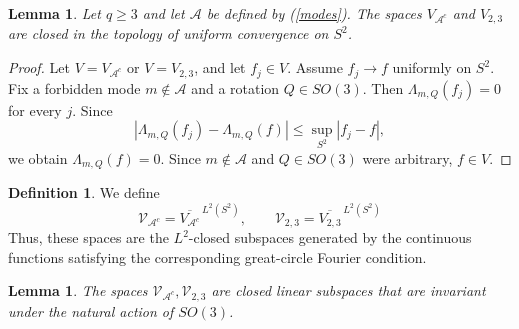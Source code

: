 \documentclass[11pt]{article}
\newtheorem{lemma}[theorem]{Lemma}
\theoremstyle{definition}
\newtheorem{definition}[theorem]{Definition}
\begin{document}
\begin{lemma}\label{dlp4}
	Let $q\ge 3$ and let ${\mathcal A}$ be defined by  (\ref{modes}). The spaces \(V_{{\mathcal A}^c} \) and \(V_{2,3}\) are closed in the topology of uniform convergence on \(S^2\).
\end{lemma}

\begin{proof}
	Let $V=V_{{\mathcal A}^c} $ or $V=V_{2,3}$, and let 
	\(f_j\in V\). Assume \(f_j\to f\) uniformly on \(S^2\). Fix a forbidden mode
	\(m\notin\mathcal A\) and a rotation \(Q\in SO(3)\). Then
	$
	\Lambda_{m,Q}(f_j)=0
	$
	for every \(j\). Since
	\[
	|\Lambda_{m,Q}(f_j)-\Lambda_{m,Q}(f)|
	\le
	\sup_{S^2}|f_j-f|,
	\]
	we obtain
	$
	\Lambda_{m,Q}(f)=0.
	$
	Since \(m\notin\mathcal A\) and \(Q\in SO(3)\) were arbitrary, \(f\in V\).
\end{proof}



\begin{definition}
	We define
	\[
	{\mathcal V}_{{\mathcal A}^c}=\overline{V_{{\mathcal A}^c}}^{\,L^2(S^2)}, \qquad 	{\mathcal V}_{2,3}=\overline{V_{2,3}}^{\,L^2(S^2)}
	\]
	Thus, these spaces are  the \(L^2\)-closed subspaces generated by the continuous functions
	satisfying the corresponding great-circle Fourier condition.
\end{definition}

\begin{lemma}\label{votjetoda1}
	The spaces $	{\mathcal V}_{{\mathcal A}^c},	{\mathcal V}_{2,3}$ are  closed linear subspaces that are invariant under
	the natural action of \(SO(3)\).
\end{lemma}
\end{document}
